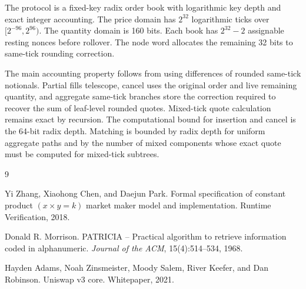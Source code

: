 \documentclass[11pt]{article}
\begin{document}
The protocol is a fixed-key radix order book with logarithmic key depth
and exact integer accounting.  The price domain has \(2^{32}\) logarithmic
ticks over \([2^{-96},2^{96})\).  The quantity domain is 160 bits.  Each
book has \(2^{32}-2\) assignable resting nonces before rollover.  The
node word allocates the remaining 32 bits to same-tick rounding
correction.

The main accounting property follows from using differences of rounded
same-tick notionals.  Partial fills telescope, cancel uses the original
order and live remaining quantity, and aggregate same-tick branches store
the correction required to recover the sum of leaf-level rounded quotes.
Mixed-tick quote calculation remains exact by recursion.  The computational
bound for insertion and cancel is the 64-bit radix depth.  Matching is
bounded by radix depth for uniform aggregate paths and by the number of
mixed components whose exact quote must be computed for mixed-tick
subtrees.

\begin{thebibliography}{9}

Yi Zhang, Xiaohong Chen, and Daejun Park.
\newblock Formal specification of constant product \((x \times y = k)\)
market maker model and implementation.
\newblock Runtime Verification, 2018.

Donald R. Morrison.
\newblock PATRICIA -- Practical algorithm to retrieve information coded
in alphanumeric.
\newblock \emph{Journal of the ACM}, 15(4):514--534, 1968.

Hayden Adams, Noah Zinsmeister, Moody Salem, River Keefer, and Dan
Robinson.
\newblock Uniswap v3 core.
\newblock Whitepaper, 2021.

\end{thebibliography}
\end{document}

